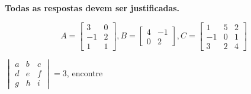 \documentclass{prova}
\DeclareMathOperator{\tr}{tr}
\begin{document}

    \textbf{Todas as respostas devem ser justificadas.}

    \begin{questionario}
    	\[A = \begin{bmatrix}
    			3 & 0 \\
    			-1 & 2 \\
    			1 & 1
    		\end{bmatrix},
    	B = \begin{bmatrix}
    			4 & -1 \\
    			0 & 2
    		\end{bmatrix},
    	C = \begin{bmatrix}
    			1 & 5 & 2 \\
    			-1 & 0 & 1 \\
    			3 & 2 & 4
        \end{bmatrix}\]
            \begin{enumerate*}
                \hspace{0.5cm}
                \hspace{0.5cm}
                \hspace{0.5cm}
                \hspace{0.5cm}
                \hspace{0.5cm}
                \hspace{0.5cm}
                \qq{$\tr(AA^T+C)$}
            \end{enumerate*}
            $\begin{vmatrix}
    			a & b & c \\
    			d & e & f \\
    			g & h & i
    		\end{vmatrix}=3$,
    		encontre


\end{questionario}
\end{document}
